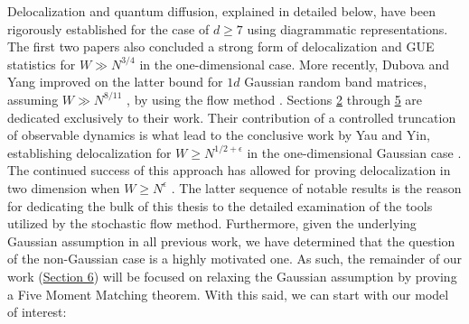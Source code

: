 \documentclass[11pt]{article}
\begin{document}
\noindent Delocalization and quantum diffusion, explained in detailed below, have been rigorously established for the case of $d\geq 7$ \cite{8, 9, 40, highdim} using diagrammatic representations. The first two papers also 
concluded a strong form of delocalization and GUE statistics for  $W\gg N^{3/4}$ \cite{8, 9} in the one-dimensional case. More recently, Dubova and Yang improved on the latter bound for $1d$ Gaussian random band matrices, assuming $W\gg N^{8/11}$ \cite{bandSDE}, by using the flow method \cite{RP, soosten}. Sections \hyperref[sec:flow]{2} through \hyperref[sec:drift]{5} are dedicated exclusively to their work. Their contribution of a controlled truncation of observable dynamics is what lead to the conclusive work by Yau and Yin, establishing delocalization for $W\geq N^{{1/2}+\epsilon}$ in the one-dimensional Gaussian case \cite{yauyin}. The continued success of this approach has allowed for proving delocalization in two dimension when $W\geq N^\epsilon$ \cite{twodim}. The latter sequence of notable results is the reason for dedicating the bulk of this thesis to the detailed examination of the tools utilized by the stochastic flow method. Furthermore, given the underlying Gaussian assumption in all previous work, we have determined that the question of the non-Gaussian case is a highly motivated one. As such, the remainder of our work (\hyperref[sec:non-gaussian]{Section 6}) will be focused on relaxing the Gaussian assumption by proving a Five Moment Matching theorem. With this said, we can start with our model of interest:

\newpage
\end{document}
